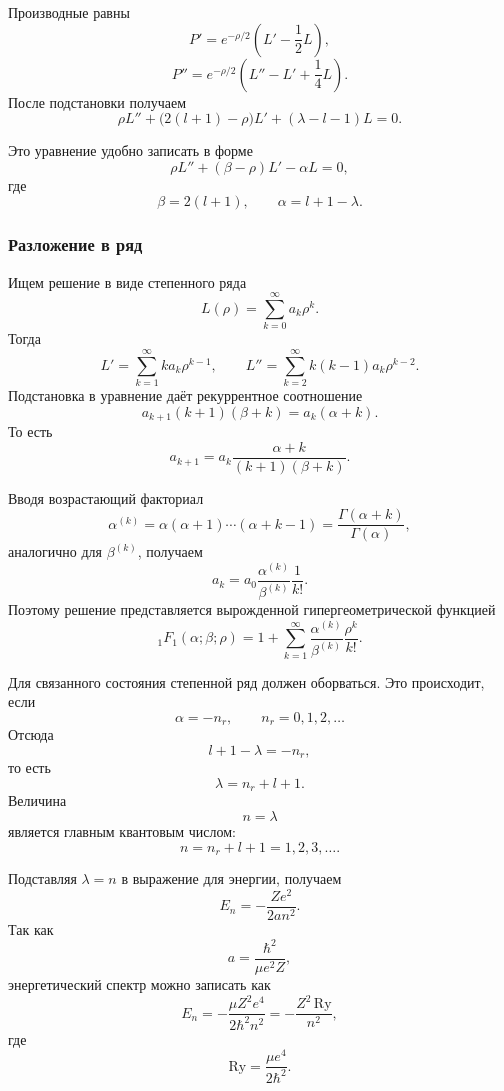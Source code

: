 \documentclass[12pt,a4paper]{article}
\begin{document}
Производные равны
\[
    P'
    =
    e^{-\rho/2}
    \left(
        L'-\frac12L
    \right),
\]
\[
    P''
    =
    e^{-\rho/2}
    \left(
        L''-L'+\frac14L
    \right).
\]
После подстановки получаем
\[
    \boxed{
        \rho L''
        +
        \bigl(2(l+1)-\rho\bigr)L'
        +
        (\lambda-l-1)L
        =
        0
    }.
\]

Это уравнение удобно записать в форме
\[
    \rho L''+(\beta-\rho)L'-\alpha L=0,
\]
где
\[
    \boxed{
        \beta=2(l+1),
        \qquad
        \alpha=l+1-\lambda
    }.
\]

\subsubsection{Разложение в ряд}

Ищем решение в виде степенного ряда
\[
    L(\rho)
    =
    \sum_{k=0}^{\infty}a_k\rho^k.
\]
Тогда
\[
    L'
    =
    \sum_{k=1}^{\infty}
        ka_k\rho^{k-1},
    \qquad
    L''
    =
    \sum_{k=2}^{\infty}
        k(k-1)a_k\rho^{k-2}.
\]
Подстановка в уравнение даёт рекуррентное соотношение
\[
    \boxed{
        a_{k+1}(k+1)(\beta+k)
        =
        a_k(\alpha+k)
    }.
\]
То есть
\[
    a_{k+1}
    =
    a_k
    \frac{\alpha+k}{(k+1)(\beta+k)}.
\]

Вводя возрастающий факториал
\[
    \alpha^{(k)}
    =
    \alpha(\alpha+1)\cdots(\alpha+k-1)
    =
    \frac{\Gamma(\alpha+k)}{\Gamma(\alpha)},
\]
аналогично для $\beta^{(k)}$, получаем
\[
    a_k
    =
    a_0
    \frac{\alpha^{(k)}}{\beta^{(k)}}
    \frac{1}{k!}.
\]
Поэтому решение представляется вырожденной гипергеометрической
функцией
\[
    \boxed{
    {}_1F_1(\alpha;\beta;\rho)
    =
    1+
    \sum_{k=1}^{\infty}
    \frac{\alpha^{(k)}}{\beta^{(k)}}
    \frac{\rho^k}{k!}
    }.
\]

Для связанного состояния степенной ряд должен оборваться. Это
происходит, если
\[
    \alpha=-n_r,
    \qquad
    n_r=0,1,2,\ldots
\]
Отсюда
\[
    l+1-\lambda=-n_r,
\]
то есть
\[
    \boxed{
        \lambda=n_r+l+1
    }.
\]
Величина
\[
    n=\lambda
\]
является главным квантовым числом:
\[
    \boxed{
        n=n_r+l+1=1,2,3,\ldots
    }.
\]

Подставляя $\lambda=n$ в выражение для энергии, получаем
\[
    E_n
    =
    -\frac{Ze^2}{2an^2}.
\]
Так как
\[
    a=\frac{\hbar^2}{\mu e^2Z},
\]
энергетический спектр можно записать как
\[
    \boxed{
        E_n
        =
        -\frac{\mu Z^2e^4}{2\hbar^2n^2}
        =
        -\frac{Z^2\,\mathrm{Ry}}{n^2}
    },
\]
где
\[
    \mathrm{Ry}
    =
    \frac{\mu e^4}{2\hbar^2}.
\]
\end{document}
